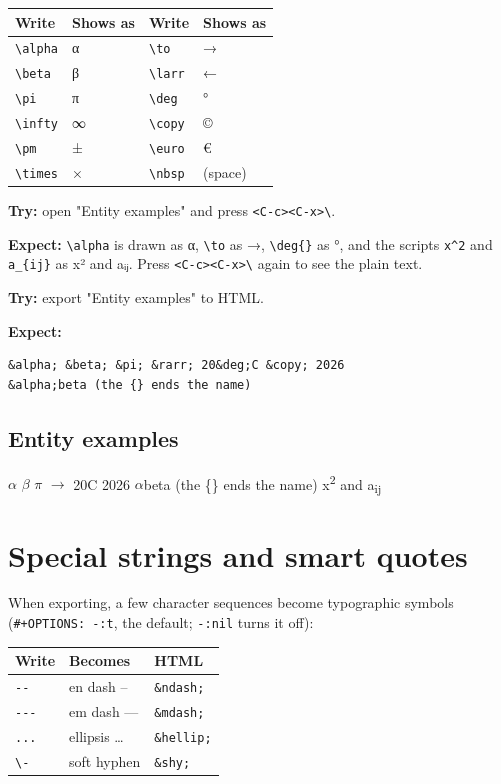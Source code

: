 \begin{center}
\begin{tabular}{llll}
Write & Shows as & Write & Shows as\\
\hline
\texttt{\textbackslash{}alpha} & α & \texttt{\textbackslash{}to} & →\\
\texttt{\textbackslash{}beta} & β & \texttt{\textbackslash{}larr} & ←\\
\texttt{\textbackslash{}pi} & π & \texttt{\textbackslash{}deg} & °\\
\texttt{\textbackslash{}infty} & ∞ & \texttt{\textbackslash{}copy} & ©\\
\texttt{\textbackslash{}pm} & ± & \texttt{\textbackslash{}euro} & €\\
\texttt{\textbackslash{}times} & × & \texttt{\textbackslash{}nbsp} & (space)\\
\end{tabular}
\end{center}

\textbf{Try:} open "Entity examples" and press \texttt{<C-c><C-x>\textbackslash{}}.

\textbf{Expect:} \texttt{\textbackslash{}alpha} is drawn as α, \texttt{\textbackslash{}to} as →, \texttt{\textbackslash{}deg\{\}} as °, and the
scripts \texttt{x\textasciicircum{}2} and \texttt{a\_\{ij\}} as x² and aᵢⱼ. Press \texttt{<C-c><C-x>\textbackslash{}} again to see
the plain text.

\textbf{Try:} export "Entity examples" to HTML.

\textbf{Expect:}
\begin{verbatim}
&alpha; &beta; &pi; &rarr; 20&deg;C &copy; 2026
&alpha;beta (the {} ends the name)
\end{verbatim}
\subsection{Entity examples}
\label{sec:orgc4eb537}
\(\alpha\) \(\beta\) \(\pi\) \(\to\) 20\textdegree{}C \textcopyright{} 2026
\(\alpha\)beta (the \{\} ends the name)
x\textsuperscript{2} and a\textsubscript{ij}
\section{Special strings and smart quotes}
\label{sec:org5570f68}
When exporting, a few character sequences become typographic symbols
(\texttt{\#+OPTIONS: -:t}, the default; \texttt{-:nil} turns it off):

\begin{center}
\begin{tabular}{lll}
Write & Becomes & HTML\\
\hline
\texttt{-{}-{}} & en dash – & \texttt{\&ndash;}\\
\texttt{-{}-{}-} & em dash — & \texttt{\&mdash;}\\
\texttt{...} & ellipsis … & \texttt{\&hellip;}\\
\texttt{\textbackslash{}-} & soft hyphen & \texttt{\&shy;}\\
\end{tabular}
\end{center}

